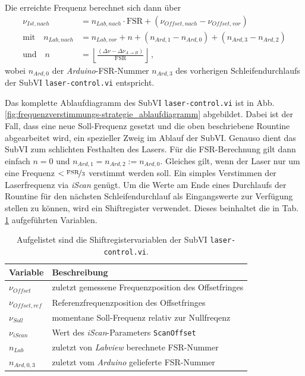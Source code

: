 Die erreichte Frequenz berechnet sich dann über
\begin{equation}\label{eq:neue_frequenz_strategie_2}
	\begin{split}
		\nu_{Ist,nach} &=
		n_{Lab,nach}\cdot\text{FSR}+(\nu_{Offset,nach}-\nu_{Offset,vor})\\
		\text{mit}\quad
		n_{Lab,nach} &= n_{Lab,vor}+n+(n_{Ard,1}-n_{Ard,0})+(n_{Ard,3}-n_{Ard,2})\\
		\text{und}\quad
		n &= \left\lfloor\frac{(\Delta\nu-\Delta\nu_{A\rightarrow
		B})}{\text{FSR}}\right\rfloor\,,
	\end{split}
\end{equation}
wobei $n_{Ard,0}$ der \textit{Arduino}-FSR-Nummer $n_{Ard,3}$ des vorherigen
Schleifendurchlaufs der SubVI \lstinline|laser-control.vi| entspricht.\par
Das komplette Ablaufdiagramm des SubVI \lstinline|laser-control.vi| ist in Abb.
\ref{fig:frequenzverstimmungs-strategie_ablaufdiagramm} abgebildet. Dabei ist
der Fall, dass eine neue Soll-Frequenz gesetzt und die oben beschriebene
Rountine abgearbeitet wird, ein spezieller Zweig im Ablauf der SubVI. Genauso
dient das SubVI zum schlichten Festhalten des Lasers. Für die FSR-Berechnung
gilt dann einfach $n=0$ und $n_{Ard,1}=n_{Ard,2}:=n_{Ard,0}$. Gleiches gilt,
wenn der Laser nur um eine Frequenz $<\nicefrac{\text{FSR}}{3}$ verstimmt werden
soll. Ein simples Verstimmen der Laserfrequenz via \textit{iScan} genügt. Um die
Werte am Ende eines Durchlaufs der Rountine für den nächsten Schleifendurchlauf
als Eingangswerte zur Verfügung stellen zu können, wird ein Shiftregister
verwendet.
Dieses beinhaltet die in Tab.
\ref{tab:shiftregister_laserkontrolle} aufgeführten Variablen.
\begin{table}
	\begin{tabular}{p{}p{}}
		\toprule
			Variable & Beschreibung \\
		\midrule[1px]
		\hline
			$\nu_{Offset}$ & zuletzt gemessene Frequenzposition des Offsetfringes\\
			$\nu_{Offset,ref}$ & Referenzfrequenzposition des Offsetfringes\\
			$\nu_{Soll}$ & momentane Soll-Frequenz relativ zur Nullfreqenz\\
			$\nu_{iScan}$ & Wert des \textit{iScan}-Parameters \lstinline|ScanOffset|\\
			$n_{Lab}$ & zuletzt von \textit{Labview} berechnete FSR-Nummer\\
			$n_{Ard,0,3}$ & zuletzt vom \textit{Arduino} gelieferte FSR-Nummer\\
		\bottomrule[1px]
	\end{tabular}
	\caption[Shiftregister -
	\lstinline|laser-control.vi|]{Aufgelistet sind die Shiftregistervariablen der
	SubVI \lstinline|laser-control.vi|.}
	\label{tab:shiftregister_laserkontrolle}
\end{table}
